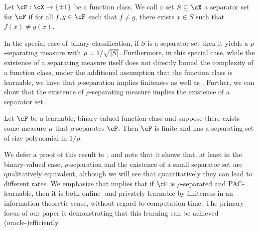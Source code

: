     \begin{definition}\label{def:separator_set}
        Let $\cF: \cX \to \left\{ \pm 1 \right\}$ be a function class.
        We call a set $S \subseteq \cX$ a separator set for $\cF$ if for all $f , g \in \cF$ such that $f \neq g$, there exists $x \in S$ such that $f(x) \neq g(x)$.
    \end{definition}
    In the special case of binary classification, if $S$ is a separator set then it yields a $\rho$-separating measure with $\rho = 1/\sqrt{\left|S\right|}$.  Furthermore, in this special case, while the existence of a separating measure itself does not directly bound the complexity of a function class, under the additional assumption that the function class is learnable,
    we have that $\rho$-separation implies finiteness as well as .
    Further, we can show that the existence of $ \rho $-separating measure implies the existence of a separator set.
    \begin{proposition}\label{lem:separating_measure_sample}
        Let $\cF$ be a learnable, binary-valued function class and suppose there exists some measure $\mu$ that $\rho$-separates $\cF$.  Then $\cF$ is finite and has a separating set of size polynomial in $1/\rho$.
    \end{proposition}
    We defer a proof of this result to , and note that it shows that, at least in the binary-valued case, $\rho$-separation and the existence of a small separator set are qualitatively equivalent, although we will see that quantitatively they can lead to different rates.  
    We emphasize that  implies that if $\cF$ is $\rho$-separated and PAC-learnable, then it is both online- and privately-learnable by finiteness in an information theoretic sense, without regard to computation time.
    The primary focus of our paper is demonstrating that this learning can be achieved (oracle-)efficiently.

    





 









    






    





        






























